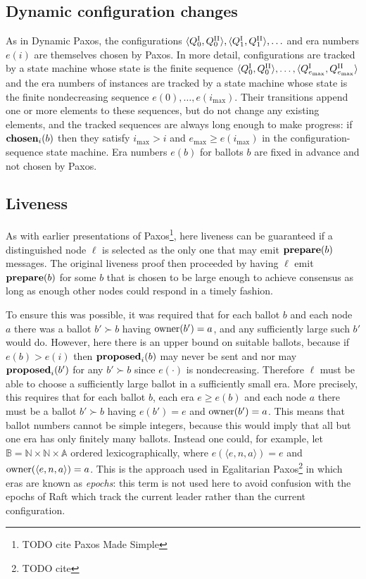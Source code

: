 \documentclass[journal]{IEEEtran}
\begin{document}
\subsection{Dynamic configuration changes}

As in Dynamic Paxos, the configurations $\langle {Q}^\textrm{I}_{0}, {Q}^\textrm{II}_{0} \rangle,
\langle {Q}^\textrm{I}_{1}, {Q}^\textrm{II}_{1} \rangle, \ldots$ and era numbers $e(i)$ are themselves
chosen by Paxos. In more detail, configurations are tracked by a state machine
whose state is the finite sequence $\langle {Q}^\textrm{I}_{0}, {Q}^\textrm{II}_{0} \rangle, \ldots,
\langle {Q}^\textrm{I}_{e_\mathrm{max}}, {Q}^\textrm{II}_{e_\mathrm{max}} \rangle$ and the era numbers
of instances are tracked by a state machine whose state is the finite
nondecreasing sequence $e(0), \ldots, e(i_\mathrm{max})$.  Their transitions
append one or more elements to these sequences, but do not change any existing
elements, and the tracked sequences are always long enough to make progress: if
$\mathbf{chosen}_{i}(b)$ then they satisfy $i_\mathrm{max} > i$ and $e_\mathrm{max} \ge
e(i_\mathrm{max})$ in the configuration-sequence state machine. Era numbers
$e(b)$ for ballots $b$ are fixed in advance and not chosen by Paxos.

\subsection{Liveness}\label{liveness}

As with earlier presentations of Paxos\footnote{TODO cite Paxos Made Simple},
here liveness can be guaranteed if a distinguished node $\ell$ is selected as
the only one that may emit $\mathbf{prepare}(b)$ messages. The original liveness proof
then proceeded by having $\ell$ emit $\mathbf{prepare}(b)$ for some $b$ that is chosen to
be large enough to achieve consensus as long as enough other nodes could
respond in a timely fashion.

To ensure this was possible, it was required that for each ballot $b$ and each
node $a$ there was a ballot $b' \succ b$ having $\mathrm{owner}(b') = a$, and any
sufficiently large such $b'$ would do. However, here there is an upper bound on
suitable ballots, because if $e(b) > e(i)$ then $\mathbf{proposed}_{i}(b)$ may never be sent
and nor may $\mathbf{proposed}_{i}(b')$ for any $b' \succ b$ since $e(\cdot)$ is
nondecreasing.  Therefore $\ell$ must be able to choose a sufficiently large
ballot in a sufficiently small era. More precisely, this requires that for each
ballot $b$, each era $e \ge e(b)$ and each node $a$ there must be a ballot $b'
\succ b$ having $e(b') = e$ and $\mathrm{owner}(b') = a$.  This means that ballot
numbers cannot be simple integers, because this would imply that all but one
era has only finitely many ballots.  Instead one could, for example, let
$\mathbb B = \mathbb N \times \mathbb N \times \mathbb A$ ordered
lexicographically, where $e(\langle e, n, a\rangle) = e$ and $\mathrm{owner}(\langle e,
n, a \rangle) = a$. This is the approach used in Egalitarian
Paxos\footnote{TODO cite} in which eras are known as \textit{epochs}: this term
is not used here to avoid confusion with the epochs of Raft which track the
current leader rather than the current configuration.
\end{document}
